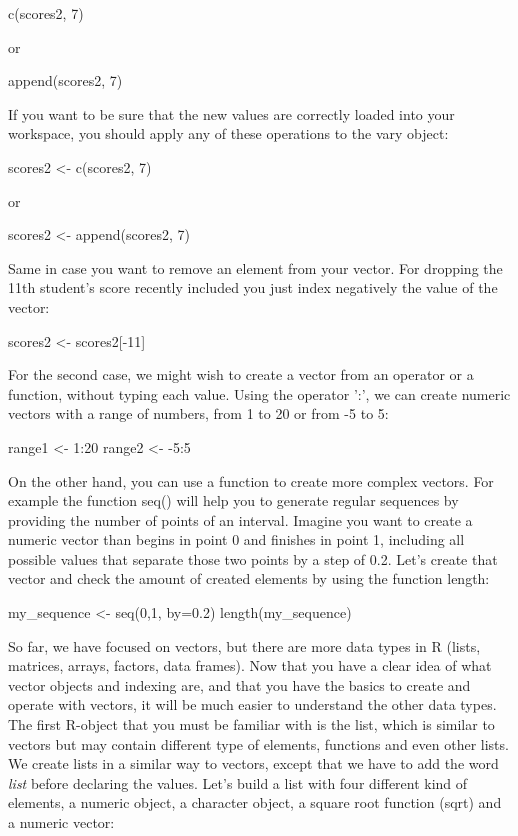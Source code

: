 \begin{exampler}
c(scores2, 7)
\end{exampler}

or

\begin{exampler}
append(scores2, 7)
\end{exampler}

If you want to be sure that the new values are correctly loaded into your workspace, you should apply any of these operations to the vary object:

\begin{exampler}
scores2 <- c(scores2, 7)
\end{exampler}

or

\begin{exampler}
scores2 <- append(scores2, 7)
\end{exampler}

Same in case you want to remove an element from your vector. For dropping the 11th student's score recently included you just index negatively the value of the vector:

\begin{exampler}
scores2 <- scores2[-11]
\end{exampler}

For the second case, we might wish to create a vector from an operator or a function, without typing each value. Using the operator ':', we can create numeric vectors with a range of numbers, from 1 to 20 or from -5 to 5:	

\begin{exampler}
range1 <- 1:20
range2 <- -5:5
\end{exampler}

On the other hand, you can use a function to create more complex vectors. For example the function seq() will help you to generate regular sequences by providing the number of points of an interval.  Imagine you want to create a numeric vector than begins in point 0 and finishes in point 1, including all possible values that separate those two points by a step of 0.2. Let's create that vector and check the amount of created elements by using the function length:

\begin{exampler}
my_sequence <- seq(0,1, by=0.2)
length(my_sequence)
\end{exampler}

So far, we have focused on vectors, but there are more data types in R (lists, matrices, arrays, factors, data frames). Now that you have a clear idea of what vector objects and indexing are, and that you have the basics to create and operate with vectors, it will be much easier to understand the other data types. The first R-object that you must be familiar with is the list, which is similar to vectors but may contain different type of elements, functions and even other lists. We create lists in a similar way to vectors, except that we have to add the word \emph{list} before declaring the values. Let's build a list with four different kind of elements, a numeric object, a character object, a square root function (sqrt) and a numeric vector:

